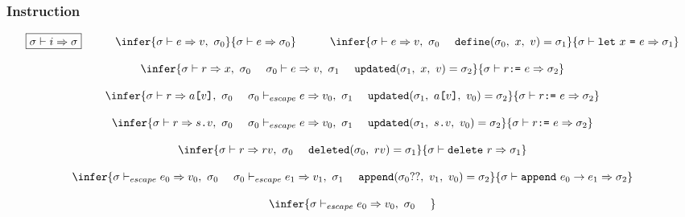 \documentclass[11pt]{article}
\newcommand{\Term}[1]{\texttt{#1}}
\newcommand{\cs}[0]{\quad}
\newcommand{\symstate}[0]{\sigma}
\newcommand{\evalinst}[3]{#1 \vdash #2 \Rightarrow #3}
\newcommand{\evalexpr}[4]{#1 \vdash #2 \Rightarrow #3,\ #4}
\newcommand{\evalescexpr}[4]{#1 \vdash_{escape} #2 \Rightarrow #3,\ #4}
\newcommand{\evalref}[4]{#1 \vdash #2 \Rightarrow #3,\ #4}
\begin{document}
\newpage

\subsubsection{Instruction}

\[
\begin{array}{c}
\multicolumn{1}{c}{\begin{array}{ccccc}
\fbox{$\evalinst{\symstate}{i}{\symstate}$}
&
\cs
&
\infer
{ \evalexpr{\symstate}{e}{v}{\symstate_0} }
{ \evalinst{\symstate}{e}{\symstate_0} }
&
\cs
&
\infer
{ \evalexpr{\symstate}{e}{v}{\symstate_0}\ \ \ \
\Term{define}( \symstate_0,\ x,\ v ) = \symstate_1}
{ \evalinst{\symstate}{\Term{let}\ x\ \Term{=}\ e}{\symstate_1} }
\end{array}}
\\ \\
\infer
{ \evalref{\symstate}{r}{x}{\symstate_0}\ \ \ \
\evalexpr{\symstate_0}{e}{v}{\symstate_1}\ \ \ \
\Term{updated}(\symstate_1,\ x,\ v ) = \symstate_2}
{ \evalinst{\symstate}{r \Term{:=}\ e}{\symstate_2} }
\\ \\
\infer
{ \evalref{\symstate}{r}{a\Term{[} v \Term{]}}{\symstate_0}\ \ \ \
\evalescexpr{\symstate_0}{e}{v_0}{\symstate_1}\ \ \ \
\Term{updated}(\symstate_1,\ a\Term{[} v \Term{]},\ v_0 ) = \symstate_2 }
{ \evalinst{\symstate}{r \Term{:=}\ e}{\symstate_2} }
\\ \\
\infer
{ \evalref{\symstate}{r}{s\Term{.}v}{\symstate_0}\ \ \ \
\evalescexpr{\symstate_0}{e}{v_0}{\symstate_1}\ \ \ \
\Term{updated}(\symstate_1,\ s\Term{.}v,\ v_0 ) = \symstate_2}
{ \evalinst{\symstate}{r \Term{:=}\ e}{\symstate_2} }
\\ \\
\infer
{ \evalref{\symstate}{r}{rv}{\symstate_0}\ \ \ \
\Term{deleted}(\symstate_0,\ rv) = \symstate_1}
{ \evalinst{\symstate}{\Term{delete}\ r}{\symstate_1} }
\\ \\
\infer
{ \evalescexpr{\symstate}{e_0}{v_0}{\symstate_0}\ \ \ \
\evalescexpr{\symstate_0}{e_1}{v_1}{\symstate_1}\ \ \ \
\Term{append}(\symstate_0 ??,\ v_1,\ v_0) = \symstate_2}
{ \evalinst{\symstate}{\Term{append}\ e_0 \to e_1}{\symstate_2} }
\\ \\
\infer
{ \evalescexpr{\symstate}{e_0}{v_0}{\symstate_0}\ \ \ \
}
\end{array}\]
\end{document}
